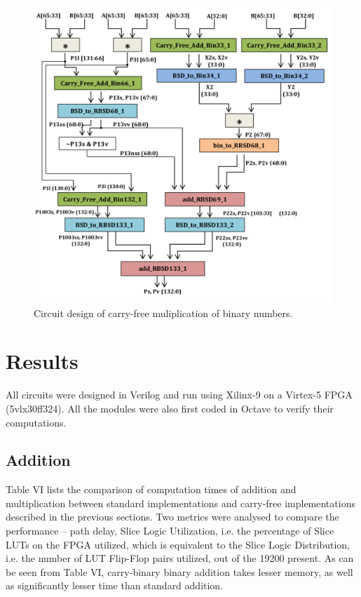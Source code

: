 \documentclass[conference]{IEEEtran}
\begin{document}
\begin{figure}[!t]
\centering
\includegraphics[width=\linewidth]{Mul.png}
\caption{Circuit design of carry-free muliplication of binary numbers.}
\label{fig_sim}
\end{figure}


\section{Results}

All circuits were designed in Verilog and run using Xilinx-9 on a Virtex-5 FPGA (5vlx30ff324). All the modules were also first coded in Octave to verify their computations.

\subsection{Addition}

Table VI lists the comparison of computation times of addition and multiplication between standard implementations and carry-free implementations described in the previous sections. Two metrics were analysed to compare the performance – path delay, Slice Logic Utilization, i.e. the percentage of Slice LUTs on the FPGA utilized, which is equivalent to the Slice Logic Distribution, i.e. the number of LUT Flip-Flop pairs utilized, out of the 19200 present. As can be seen from Table VI, carry-binary binary addition takes lesser memory, as well as significantly lesser time than standard addition.
\end{document}
